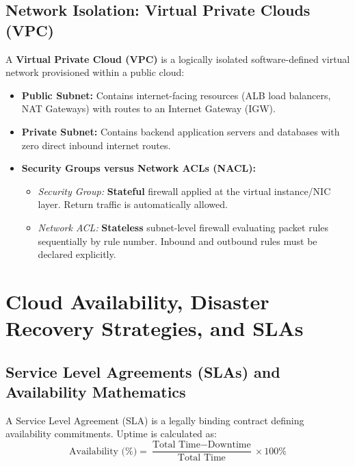\subsection{Network Isolation: Virtual Private Clouds (VPC)}
A \textbf{Virtual Private Cloud (VPC)} is a logically isolated software-defined virtual network provisioned within a public cloud:
\begin{itemize}
    \item \textbf{Public Subnet:} Contains internet-facing resources (ALB load balancers, NAT Gateways) with routes to an Internet Gateway (IGW).
    \item \textbf{Private Subnet:} Contains backend application servers and databases with zero direct inbound internet routes.
    \item \textbf{Security Groups versus Network ACLs (NACL):}
    \begin{itemize}
        \item \textit{Security Group:} \textbf{Stateful} firewall applied at the virtual instance/NIC layer. Return traffic is automatically allowed.
        \item \textit{Network ACL:} \textbf{Stateless} subnet-level firewall evaluating packet rules sequentially by rule number. Inbound and outbound rules must be declared explicitly.
    \end{itemize}
\end{itemize}


\section{Cloud Availability, Disaster Recovery Strategies, and SLAs}
\label{sec:cloud_availability_dr}

\subsection{Service Level Agreements (SLAs) and Availability Mathematics}
A Service Level Agreement (SLA) is a legally binding contract defining availability commitments. Uptime is calculated as:
\begin{equation}
\label{eq:sla_availability}
\text{Availability (\%)} = \frac{\text{Total Time} - \text{Downtime}}{\text{Total Time}} \times 100\%
\end{equation}

